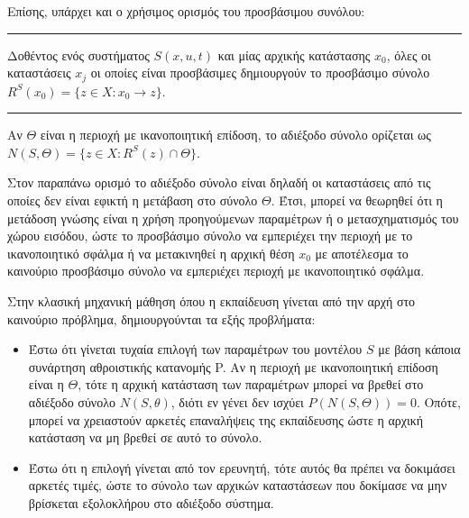 Επίσης, υπάρχει και ο χρήσιμος ορισμός του προσβάσιμου συνόλου:
\vspace{1ex}\\
{ \rule{1ex}{1ex} }%
Δοθέντος ενός συστήματος $S(x,u,t)$ και μίας αρχικής κατάστασης $x_0$, όλες οι καταστάσεις $x_j$ οι οποίες είναι προσβάσιμες δημιουργούν το προσβάσιμο σύνολο $R^{S}(x_0) = \{z\in X:x_{0}\rightarrow z \}$.
\vspace{1ex}\\
{ \rule{1ex}{1ex} }%
Αν $\Theta$ είναι η περιοχή με ικανοποιητική επίδοση, το αδιέξοδο σύνολο ορίζεται ως $N(S,\Theta) = \{z \in X: R^S(z)\cap \Theta \}$.

Στον παραπάνω ορισμό το αδιέξοδο σύνολο είναι δηλαδή οι καταστάσεις από τις οποίες δεν είναι εφικτή η μετάβαση στο σύνολο $\Theta$.
Έτσι, μπορεί να θεωρηθεί ότι η μετάδοση γνώσης είναι η χρήση προηγούμενων παραμέτρων ή ο μετασχηματισμός του χώρου εισόδου, ώστε το προσβάσιμο σύνολο να εμπεριέχει την περιοχή με το ικανοποιητικό σφάλμα ή να μετακινηθεί η αρχική θέση $x_0$ με αποτέλεσμα το καινούριο προσβάσιμο σύνολο να εμπεριέχει περιοχή με ικανοποιητικό σφάλμα. 

Στην κλασική μηχανική μάθηση όπου η εκπαίδευση γίνεται από την αρχή στο καινούριο πρόβλημα, δημιουργούνται τα εξής προβλήματα:
\begin{itemize}
    \item Έστω ότι γίνεται τυχαία επιλογή των παραμέτρων του μοντέλου $S$ με βάση κάποια συνάρτηση αθροιστικής κατανομής P. Αν η περιοχή με ικανοποιητική επίδοση είναι η $\Theta$, τότε η αρχική κατάσταση των παραμέτρων μπορεί να βρεθεί στο αδιέξοδο σύνολο $N(S,\theta)$, διότι εν γένει δεν ισχύει $P\left( N(S,\Theta)\right) = 0$. Οπότε, μπορεί να χρειαστούν αρκετές επαναλήψεις της εκπαίδευσης ώστε η αρχική κατάσταση να μη βρεθεί σε αυτό το σύνολο.
    \item Έστω ότι η επιλογή γίνεται από τον ερευνητή, τότε αυτός θα πρέπει να δοκιμάσει αρκετές τιμές, ώστε το σύνολο των αρχικών καταστάσεων που δοκίμασε να μην βρίσκεται εξολοκλήρου στο αδιέξοδο σύστημα.
\end{itemize}

